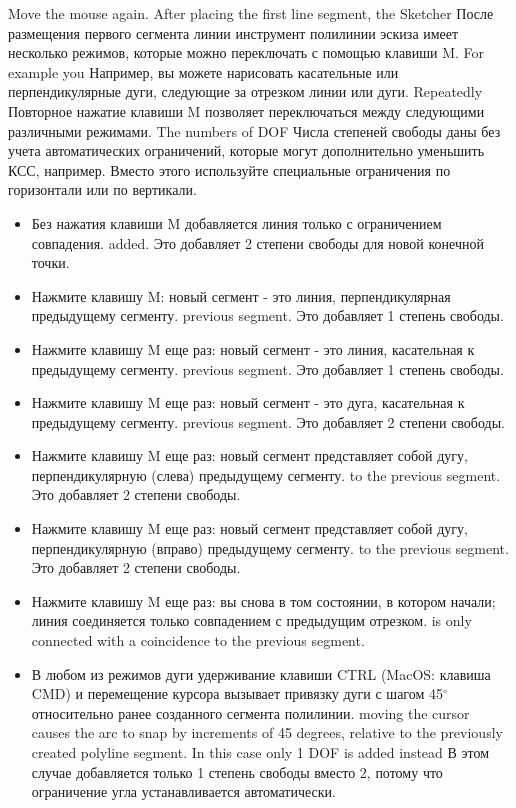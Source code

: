 \documentclass[12pt,titlepage]{article}
\newcommand{\degree}{\ensuremath{^\circ}}
\begin{document}
Move the mouse again. After placing the first line segment, the Sketcher
После размещения первого сегмента линии инструмент полилинии эскиза имеет несколько режимов, которые можно переключать с помощью клавиши M. For example you
Например, вы можете нарисовать касательные или перпендикулярные дуги, следующие за отрезком линии или дуги. Repeatedly
Повторное нажатие клавиши M позволяет переключаться между следующими различными режимами. The numbers of DOF
Числа степеней свободы даны без учета автоматических ограничений, которые могут дополнительно уменьшить КСС, например. Вместо этого используйте специальные ограничения по горизонтали или по вертикали.

\begin{itemize}
\label{PolylineMKey}
\item Без нажатия клавиши M добавляется линия только с ограничением совпадения.
      added. Это добавляет 2 степени свободы для новой конечной точки.
\item Нажмите клавишу M: новый сегмент - это линия, перпендикулярная предыдущему сегменту.
      previous segment. Это добавляет 1 степень свободы.
\item Нажмите клавишу M еще раз: новый сегмент - это линия, касательная к предыдущему сегменту.
      previous segment. Это добавляет 1 степень свободы.
\item Нажмите клавишу M еще раз: новый сегмент - это дуга, касательная к предыдущему сегменту.
      previous segment. Это добавляет 2 степени свободы.
\item Нажмите клавишу M еще раз: новый сегмент представляет собой дугу, перпендикулярную (слева) предыдущему сегменту.
      to the previous segment. Это добавляет 2 степени свободы.
\item Нажмите клавишу M еще раз: новый сегмент представляет собой дугу, перпендикулярную (вправо) предыдущему сегменту.
      to the previous segment. Это добавляет 2 степени свободы.
\item Нажмите клавишу M еще раз: вы снова в том состоянии, в котором начали; линия соединяется только совпадением с предыдущим отрезком.
      is only connected with a coincidence to the previous segment.
\item В любом из режимов дуги удерживание клавиши CTRL (MacOS: клавиша CMD) и перемещение курсора вызывает привязку дуги с шагом 45\degree{} относительно ранее созданного сегмента полилинии.
      moving the cursor causes the arc to snap by increments of 45 degrees, relative
      to the previously created polyline segment. In this case only 1 DOF is added instead
      В этом случае добавляется только 1 степень свободы вместо 2, потому что ограничение угла устанавливается автоматически.
\end{itemize}
\end{document}
